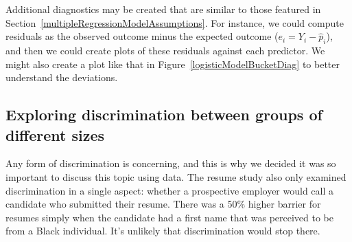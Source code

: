 Additional diagnostics may be created that are similar to those
featured in Section~\ref{multipleRegressionModelAssumptions}.
For instance, we could compute residuals as
the observed outcome minus the expected outcome
($e_i = Y_i - \hat{p}_i$),
and then we could create plots of these residuals
against each predictor.
We might also create a plot like that in
Figure~\ref{logisticModelBucketDiag}
to better understand the deviations.



\D{\newpage}

\subsection{Exploring discrimination between groups
    of different sizes}


Any form of discrimination is concerning,
and this is why we decided it was so important to discuss
this topic using data.
The resume study also only examined discrimination in a
single aspect: whether a prospective employer would
call a candidate who submitted their resume.
There was a 50\% higher barrier for resumes simply when
the candidate had a first name that was perceived to be
from a Black individual.
It's unlikely that discrimination would stop there.


